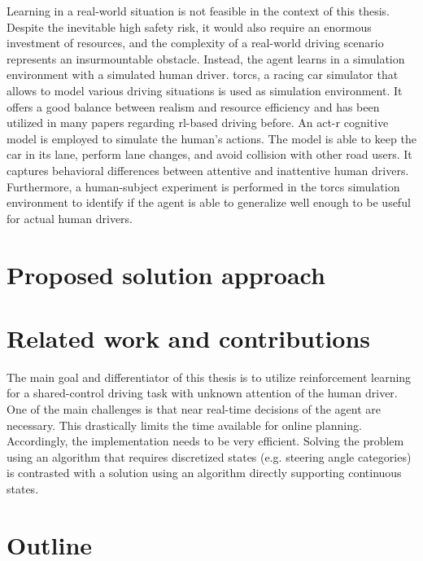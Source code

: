 Learning in a real-world situation is not feasible in the context of this thesis. Despite the inevitable high safety risk, it would also require an enormous investment of resources, and the complexity of a real-world driving scenario represents an insurmountable obstacle. Instead, the agent learns in a simulation environment with a simulated human driver. \gls{torcs}, a racing car simulator that allows to model various driving situations \parencite{torcs} is used as simulation environment. It offers a good balance between realism and resource efficiency and has been utilized in many papers regarding \gls{rl}-based driving before. An \gls{act-r} cognitive model is employed to simulate the human's actions. The model is able to keep the car in its lane, perform lane changes, and avoid collision with other road users. It captures behavioral differences between attentive and inattentive human drivers. Furthermore, a human-subject experiment is performed in the \gls{torcs} simulation environment to identify if the agent is able to generalize well enough to be useful for actual human drivers.

\section{Proposed solution approach}

\section{Related work and contributions}


The main goal and differentiator of this thesis is to utilize reinforcement learning for a shared-control driving task with unknown attention of the human driver. One of the main challenges is that near real-time decisions of the agent are necessary. This drastically limits the time available for online planning. Accordingly, the implementation needs to be very efficient. Solving the problem using an algorithm that requires discretized states (e.g. steering angle categories) is contrasted with a solution using an algorithm directly supporting continuous states.








\section{Outline}

